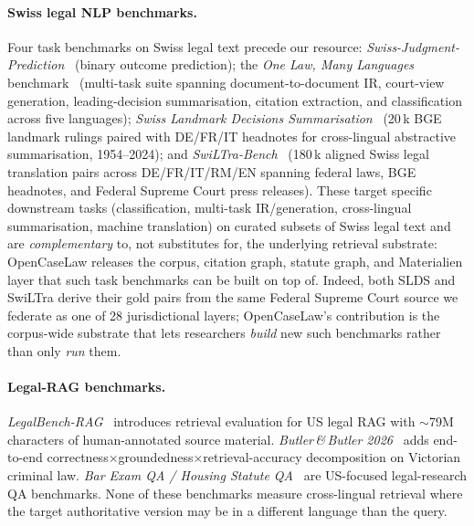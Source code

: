 \documentclass[11pt,a4paper]{article}
\begin{document}
\paragraph{Swiss legal NLP benchmarks.} Four task benchmarks on Swiss legal text precede our resource: \emph{Swiss-Judgment-Prediction}~\cite{niklaus2021} (binary outcome prediction); the \emph{One Law, Many Languages} benchmark~\cite{stern2024} (multi-task suite spanning document-to-document IR, court-view generation, leading-decision summarisation, citation extraction, and classification across five languages); \emph{Swiss Landmark Decisions Summarisation}~\cite{rolshoven2025} (20\,k BGE landmark rulings paired with DE/FR/IT headnotes for cross-lingual abstractive summarisation, 1954--2024); and \emph{SwiLTra-Bench}~\cite{niklaus2025swiltra} (180\,k aligned Swiss legal translation pairs across DE/FR/IT/RM/EN spanning federal laws, BGE headnotes, and Federal Supreme Court press releases). These target specific downstream tasks (classification, multi-task IR/generation, cross-lingual summarisation, machine translation) on curated subsets of Swiss legal text and are \emph{complementary} to, not substitutes for, the underlying retrieval substrate: OpenCaseLaw releases the corpus, citation graph, statute graph, and Materialien layer that such task benchmarks can be built on top of. Indeed, both SLDS and SwiLTra derive their gold pairs from the same Federal Supreme Court source we federate as one of 28 jurisdictional layers; OpenCaseLaw's contribution is the corpus-wide substrate that lets researchers \emph{build} new such benchmarks rather than only \emph{run} them.


\paragraph{Legal-RAG benchmarks.} \emph{LegalBench-RAG}~\cite{pipitone2024} introduces retrieval evaluation for US legal RAG with $\sim$79M characters of human-annotated source material. \emph{Butler\,\&\,Butler 2026}~\cite{butler2026} adds end-to-end correctness$\times$groundedness$\times$retrieval-accuracy decomposition on Victorian criminal law. \emph{Bar Exam QA / Housing Statute QA}~\cite{zheng2025} are US-focused legal-research QA benchmarks. None of these benchmarks measure cross-lingual retrieval where the target authoritative version may be in a different language than the query.
\end{document}
